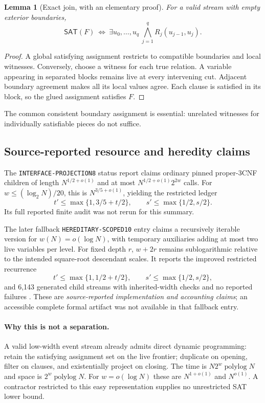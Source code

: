 \documentclass[11pt]{article}
\newtheorem{lemma}[proposition]{Lemma}
\newcommand{\SAT}{\mathsf{SAT}}
\begin{document}
\begin{lemma}[Exact join, with an elementary proof]
For a valid stream with empty exterior boundaries,
\[
 \SAT(F)\ \Longleftrightarrow\
 \exists u_0,\ldots,u_q\ \bigwedge_{j=1}^{q}R_j(u_{j-1},u_j).
\]
\end{lemma}
\begin{proof}
A global satisfying assignment restricts to compatible boundaries and
local witnesses. Conversely, choose a witness for each true relation.
A variable appearing in separated blocks remains live at every intervening
cut. Adjacent boundary agreement makes all its local values agree.
Each clause is satisfied in its block, so the glued assignment satisfies $F$.
\end{proof}
The common consistent boundary assignment is essential: unrelated witnesses
for individually satisfiable pieces do not suffice.

\subsection{Source-reported resource and heredity claims}
The \texttt{INTERFACE-PROJECTION8} status report claims ordinary pinned
proper-3CNF children of length $N^{1/2+o(1)}$ and at most
$N^{1/2+o(1)}2^{2w}$ calls. For $w\le(\log_2N)/20$, this is
$N^{3/5+o(1)}$, yielding the restricted ledger
\[
 t'\le\max\{1,3/5+t/2\},\qquad
 s'\le\max\{1/2,s/2\}.
\]
Its full reported finite audit was not rerun for this summary.

The later fallback \texttt{HEREDITARY-SCOPED10} entry claims a recursively
iterable version for $w(N)=o(\log N)$, with temporary auxiliaries adding
at most two live variables per level. For fixed depth $r$, $w+2r$
remains sublogarithmic relative to the intended square-root descendant
scales. It reports the improved restricted recurrence
\[
 t'\le\max\{1,1/2+t/2\},\qquad
 s'\le\max\{1/2,s/2\},
\]
and 6,143 generated child streams with inherited-width checks and no
reported failures \cite{fallback}. These are \emph{source-reported
implementation and accounting claims}; an accessible complete formal
artifact was not available in that fallback entry.

\paragraph{Why this is not a separation.}
A valid low-width event stream already admits direct dynamic programming:
retain the satisfying assignment set on the live frontier; duplicate on
opening, filter on clauses, and existentially project on closing.
The time is $N2^w\operatorname{polylog}N$ and space is
$2^w\operatorname{polylog}N$. For $w=o(\log N)$ these are
$N^{1+o(1)}$ and $N^{o(1)}$. A contractor restricted to this easy
representation supplies no unrestricted SAT lower bound.
\end{document}
